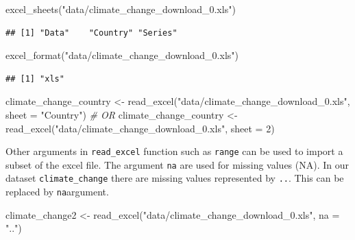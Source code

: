 \documentclass[
]{book}
\newenvironment{Shaded}{\begin{snugshade}}{\end{snugshade}}
\newcommand{\AttributeTok}[1]{\textcolor[rgb]{0.77,0.63,0.00}{#1}}
\newcommand{\CommentTok}[1]{\textcolor[rgb]{0.56,0.35,0.01}{\textit{#1}}}
\newcommand{\DecValTok}[1]{\textcolor[rgb]{0.00,0.00,0.81}{#1}}
\newcommand{\FunctionTok}[1]{\textcolor[rgb]{0.00,0.00,0.00}{#1}}
\newcommand{\NormalTok}[1]{#1}
\newcommand{\OtherTok}[1]{\textcolor[rgb]{0.56,0.35,0.01}{#1}}
\newcommand{\StringTok}[1]{\textcolor[rgb]{0.31,0.60,0.02}{#1}}
\begin{document}
\begin{Shaded}
\begin{Highlighting}[]
\FunctionTok{excel\_sheets}\NormalTok{(}\StringTok{"data/climate\_change\_download\_0.xls"}\NormalTok{)}
\end{Highlighting}
\end{Shaded}

\begin{verbatim}
## [1] "Data"    "Country" "Series"
\end{verbatim}

\begin{Shaded}
\begin{Highlighting}[]
\FunctionTok{excel\_format}\NormalTok{(}\StringTok{"data/climate\_change\_download\_0.xls"}\NormalTok{)}
\end{Highlighting}
\end{Shaded}

\begin{verbatim}
## [1] "xls"
\end{verbatim}

\begin{Shaded}
\begin{Highlighting}[]
\NormalTok{climate\_change\_country }\OtherTok{\textless{}{-}} \FunctionTok{read\_excel}\NormalTok{(}\StringTok{"data/climate\_change\_download\_0.xls"}\NormalTok{, }
                                     \AttributeTok{sheet =} \StringTok{"Country"}\NormalTok{)}
\CommentTok{\# OR}
\NormalTok{climate\_change\_country }\OtherTok{\textless{}{-}} \FunctionTok{read\_excel}\NormalTok{(}\StringTok{"data/climate\_change\_download\_0.xls"}\NormalTok{, }
                                     \AttributeTok{sheet =} \DecValTok{2}\NormalTok{)}
\end{Highlighting}
\end{Shaded}

Other arguments in \texttt{read\_excel} function such as \texttt{range} can be used to import a subset of the excel file. The argument \texttt{na} are used for missing values (NA). In our dataset \texttt{climate\_change} there are missing values represented by \texttt{..}. This can be replaced by \texttt{na}argument.

\begin{Shaded}
\begin{Highlighting}[]
\NormalTok{climate\_change2 }\OtherTok{\textless{}{-}} \FunctionTok{read\_excel}\NormalTok{(}\StringTok{"data/climate\_change\_download\_0.xls"}\NormalTok{,}
                             \AttributeTok{na =} \StringTok{".."}\NormalTok{)}
\end{Highlighting}
\end{Shaded}
\end{document}

